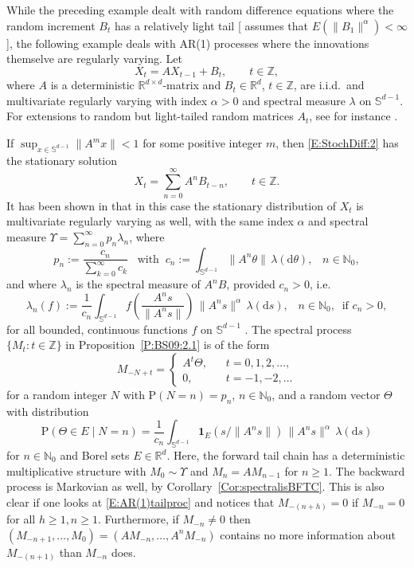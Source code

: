 \documentclass{aptpubarxiv}
\numberwithin{equation}{section}
\begin{document}
\begin{ex}
\label{heavy-tailedRDE}
While the preceding example dealt with random difference equations where the random increment $B_t$ has a relatively light tail [\cite{Kesten73} assumes that $E(\|B_1\|^\alpha)<\infty$], the following example deals with AR(1) processes where the innovations themselve are regularly varying. Let 
\begin{equation}
\label{E:StochDiff:2}
	X_t = A X_{t-1} + B_t, \qquad t \in \mathbb{Z},
\end{equation}
where $A$ is a deterministic $\mathbb{R}^{d \times d}$-matrix and $B_t \in \mathbb{R}^d$, $t \in \mathbb{Z}$, are i.i.d.\ and multivariate regularly varying with index $\alpha>0$ and spectral measure $\lambda$ on $\mathbb{S}^{d-1}$. For extensions to random but light-tailed random matrices $A_t$, see for instance \citet{HuSa08}.

If $\sup_{x \in \mathbb{S}^{d-1}}\|A^m x\|<1$ for some positive integer $m$, then \eqref{E:StochDiff:2} has the stationary solution
\[ 
  X_t=\sum_{n=0}^\infty A^n B_{t-n}, \qquad t \in \mathbb{Z}.
\]
It has been shown in \cite{MeSe10} that in this case the stationary distribution of $X_t$ is multivariate regularly varying as well, with the same index $\alpha$ and spectral measure $\Upsilon=\sum_{n=0}^\infty p_n \lambda_n$, where
$$ p_n:= \frac{c_n}{\sum_{k=0}^\infty c_k} \;\;\; \text{with} \;\; c_n:=\int_{\mathbb{S}^{d-1}}\|A^n \theta\|\, \lambda (\mathrm{d} \theta), \;\;\; n \in \mathbb{N}_0,$$
and where $\lambda_n$ is the spectral measure of $A^n B$, provided $c_n > 0$, i.e.
\[
  \lambda_n(f)
  :=
  \frac{1}{c_n}
  \int_{\mathbb{S}^{d-1}}
    f \left( \frac{A^n s}{\|A^n s\|} \right) \, \|A^n s\|^\alpha \, 
  \lambda (\mathrm{d} s),
  \;\;\; n \in \mathbb{N}_0, \;\; \mbox{if }c_n>0,
\]
for all bounded, continuous functions $f$ on $\mathbb{S}^{d-1}$ \citep[][Example~9.3]{MeSe10}. The spectral process $\{ M_t:t \in \mathbb{Z}\}$ in Proposition~\ref{P:BS09:2.1} is of the form
\begin{equation}
\label{E:AR(1)tailproc}
  M_{-N+t}=\begin{cases}
            A^t \Theta, \;\;\; & t=0, 1, 2, \ldots ,\\
            0, & t=-1,-2, \ldots
           \end{cases}
\end{equation}
for a random integer $N$ with ${\mathrm{P}}(N=n)=p_n$, $n \in \mathbb{N}_0$, and a random vector $\Theta$ with distribution
\[ 
  {\mathrm{P}}(\Theta \in E \mid N=n)
  = \frac{1}{c_n}
  \int_{\mathbb{S}^{d-1}}
    {\boldsymbol{1}}_{E} (s / \|A^n s\|) \, \|A^n s\|^\alpha \,
  \lambda (\mathrm{d} s)
\] 
for $n \in \mathbb{N}_0$ and Borel sets $E \in \mathbb{R}^d$. Here, the forward tail chain has a deterministic multiplicative structure with $M_0 \sim \Upsilon$ and $M_n=AM_{n-1}$ for $n\geq 1$. The backward process is Markovian as well, by Corollary~\ref{Cor:spectralisBFTC}. This is also clear if one looks at \eqref{E:AR(1)tailproc} and notices that $M_{-(n+h)}=0$ if $M_{-n}=0$ for all $h \geq 1, n \geq 1$. Furthermore, if $M_{-n} \neq 0$ then $(M_{-n+1}, \ldots, M_0)=(AM_{-n}, \ldots, A^n M_{-n})$ contains no more information about $M_{-(n+1)}$ than $M_{-n}$ does. 


\end{ex}
\end{document}
